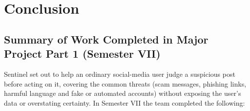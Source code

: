 \onehalfspacing
\pagestyle{fancy}
\fancyhf{}
\renewcommand{\headrulewidth}{0pt}
\cfoot{\thepage}
\chapter{Conclusion}

\section{Summary of Work Completed in Major Project Part 1 (Semester VII)}
\noindent Sentinel set out to help an ordinary social-media user judge a suspicious post before acting on it, covering the common threats (scam messages, phishing links, harmful language and fake or automated accounts) without exposing the user's data or overstating certainty. In Semester VII the team completed the following:

